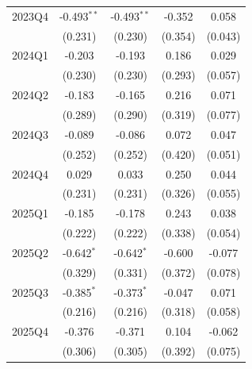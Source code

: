 \begin{table}[htbp]
\begin{tabular}{lcccc}
2023Q4 & -0.493$^{**}$ & -0.493$^{**}$ & -0.352 & 0.058 \\
 & (0.231) & (0.230) & (0.354) & (0.043) \\
2024Q1 & -0.203 & -0.193 & 0.186 & 0.029 \\
 & (0.230) & (0.230) & (0.293) & (0.057) \\
2024Q2 & -0.183 & -0.165 & 0.216 & 0.071 \\
 & (0.289) & (0.290) & (0.319) & (0.077) \\
2024Q3 & -0.089 & -0.086 & 0.072 & 0.047 \\
 & (0.252) & (0.252) & (0.420) & (0.051) \\
2024Q4 & 0.029 & 0.033 & 0.250 & 0.044 \\
 & (0.231) & (0.231) & (0.326) & (0.055) \\
2025Q1 & -0.185 & -0.178 & 0.243 & 0.038 \\
 & (0.222) & (0.222) & (0.338) & (0.054) \\
2025Q2 & -0.642$^{*}$ & -0.642$^{*}$ & -0.600 & -0.077 \\
 & (0.329) & (0.331) & (0.372) & (0.078) \\
2025Q3 & -0.385$^{*}$ & -0.373$^{*}$ & -0.047 & 0.071 \\
 & (0.216) & (0.216) & (0.318) & (0.058) \\
2025Q4 & -0.376 & -0.371 & 0.104 & -0.062 \\
 & (0.306) & (0.305) & (0.392) & (0.075) \\
\bottomrule
\end{tabular}
\par\vspace{2pt}{\footnotesize Reference quarter 2022Q3 omitted. Standard errors clustered on occupation in parentheses. * p<0.10, ** p<0.05, *** p<0.01.}
\end{table}
